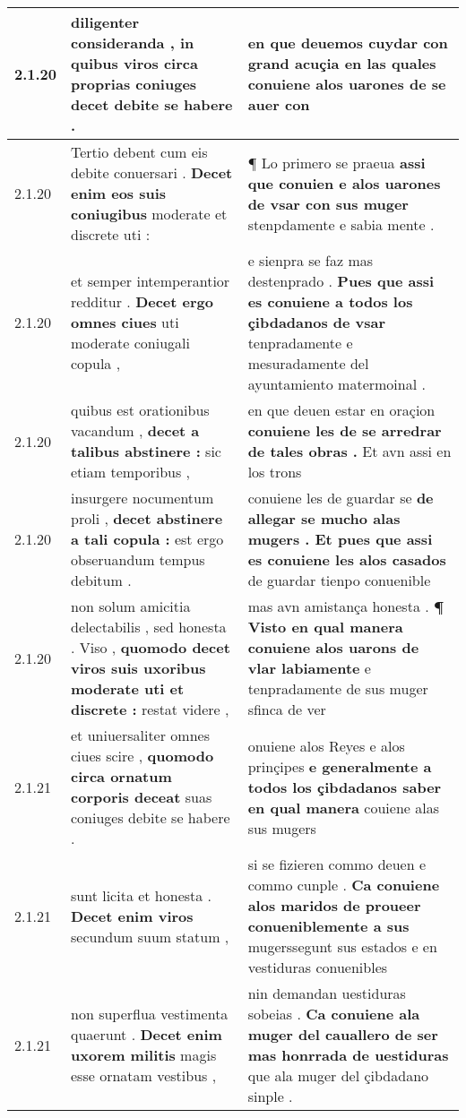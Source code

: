 \begin{tabular}{|p{1cm}|p{6.5cm}|p{6.5cm}|}
2.1.20 & diligenter consideranda , \textbf{ in quibus viros circa proprias coniuges decet } debite se habere . & en que deuemos cuydar con grand acuçia \textbf{ en las quales conuiene alos uarones de se auer } con \\\hline
2.1.20 & Tertio debent cum eis debite conuersari . \textbf{ Decet enim eos suis coniugibus } moderate et discrete uti : & ¶ Lo primero se praeua \textbf{ assi que conuien e alos uarones de vsar con sus muger } stenpdamente e sabia mente . \\\hline
2.1.20 & et semper intemperantior redditur . \textbf{ Decet ergo omnes ciues } uti moderate coniugali copula , & e sienpra se faz mas destenprado . \textbf{ Pues que assi es conuiene a todos los çibdadanos de vsar } tenpradamente e mesuradamente del ayuntamiento matermoinal . \\\hline
2.1.20 & quibus est orationibus vacandum , \textbf{ decet a talibus abstinere : } sic etiam temporibus , & en que deuen estar en oraçion \textbf{ conuiene les de se arredrar de tales obras . } Et avn assi en los trons \\\hline
2.1.20 & insurgere nocumentum proli , \textbf{ decet abstinere a tali copula : } est ergo obseruandum tempus debitum . & conuiene les de guardar se \textbf{ de allegar se mucho alas mugers . Et pues que assi es conuiene les alos casados } de guardar tienpo conuenible \\\hline
2.1.20 & non solum amicitia delectabilis , sed honesta . Viso , \textbf{ quomodo decet viros suis uxoribus moderate uti et discrete : } restat videre , & mas avn amistança honesta . \textbf{ ¶ Visto en qual manera conuiene alos uarons de vlar labiamente } e tenpradamente de sus muger sfinca de ver \\\hline
2.1.21 & et uniuersaliter omnes ciues scire , \textbf{ quomodo circa ornatum corporis deceat } suas coniuges debite se habere . & onuiene alos Reyes e alos prinçipes \textbf{ e generalmente a todos los çibdadanos saber en qual manera } couiene alas sus mugers \\\hline
2.1.21 & sunt licita et honesta . \textbf{ Decet enim viros } secundum suum statum , & si se fizieren commo deuen e commo cunple . \textbf{ Ca conuiene alos maridos de proueer conueniblemente a sus } mugerssegunt sus estados e en vestiduras conuenibles \\\hline
2.1.21 & non superflua vestimenta quaerunt . \textbf{ Decet enim uxorem militis } magis esse ornatam vestibus , & nin demandan uestiduras sobeias . \textbf{ Ca conuiene ala muger del cauallero de ser mas honrrada de uestiduras } que ala muger del çibdadano sinple . \\\hline

\end{tabular}
